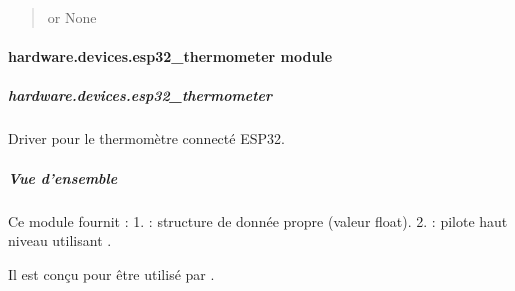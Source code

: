\documentclass[letterpaper,10pt,french]{sphinxmanual}
\begin{document}
\begin{fulllineitems}
\begin{fulllineitems}
\begin{quote}
\begin{description}
\sphinxAtStartPar
{\hyperref[\detokenize{api/hardware.devices:hardware.devices.caliper.CaliperData}]{}} or None

\end{description}\end{quote}

\end{fulllineitems}


\end{fulllineitems}



\paragraph{hardware.devices.esp32\_thermometer module}
\label{\detokenize{api/hardware.devices:module-hardware.devices.esp32_thermometer}}\label{\detokenize{api/hardware.devices:hardware-devices-esp32-thermometer-module}}

\subparagraph{hardware.devices.esp32\_thermometer}
\label{\detokenize{api/hardware.devices:hardware-devices-esp32-thermometer}}
\sphinxAtStartPar
Driver pour le thermomètre connecté ESP32.


\subparagraph{Vue d’ensemble}
\label{\detokenize{api/hardware.devices:id1}}
\sphinxAtStartPar
Ce module fournit :
1.  : structure de donnée propre (valeur float).
2.  : pilote haut niveau utilisant .

\sphinxAtStartPar
Il est conçu pour être utilisé par .
\end{document}
